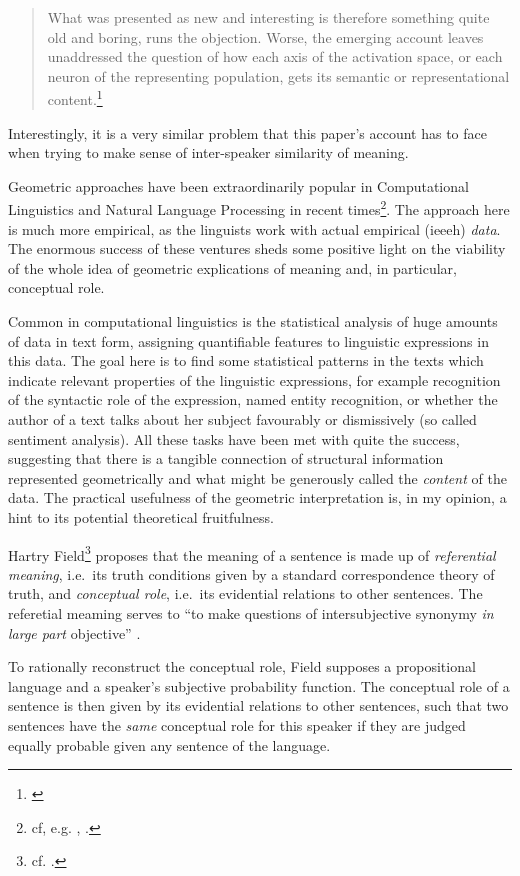 \documentclass[11pt, a4paper]{scrartcl}
\renewcommand{\i}[1]{\emph{#1}}
\begin{document}
{\singlespacing{} 
\begin{quote}What was presented as new and interesting is therefore something quite old and boring, runs the objection. Worse, the emerging account leaves unaddressed the question of how each axis of the activation space, or each neuron of the representing population, gets its semantic or representational content.\footnote{\textcite[7]{10.2307/2564566}}
 \end{quote}
}
 Interestingly, it is a very similar problem that this paper's account has to face when trying to make sense of inter-speaker similarity of meaning.

Geometric approaches have been extraordinarily popular in Computational Linguistics and Natural Language Processing in recent times\footnote{cf, e.g. \textcite{erk2008structured}, \textcite{sahlgren2006word}.}. The approach here is much more empirical, as the linguists work with actual empirical (ieeeh) \i{data}. The enormous success of these ventures sheds some positive light on the viability of the whole idea of geometric explications of meaning and, in particular, conceptual role.

Common in computational linguistics is the statistical analysis of huge amounts of data in text form, assigning quantifiable features to linguistic expressions in this data. The goal here is to find some statistical patterns in the texts which indicate relevant properties of the linguistic expressions, for example recognition of the syntactic role of the expression, named entity recognition, or whether the author of a text talks about her subject favourably or dismissively (so called sentiment analysis). All these tasks have been met with quite the success, suggesting that there is a tangible connection of structural information represented geometrically and what might be generously called the \i{content} of the data. The practical usefulness of the geometric interpretation is, in my opinion, a hint to its potential theoretical fruitfulness. 

Hartry Field\footnote{cf. \textcite{Field1977}.} proposes that the meaning of a sentence is made up of \i{referential meaning}, i.e.\ its truth conditions given by a standard correspondence theory of truth, and \i{conceptual role}, i.e.\ its evidential relations to other sentences. The referetial meaming serves to ``to make questions of intersubjective synonymy \i{in large part} objective'' \parencite[399]{Field1977}.

To rationally reconstruct the conceptual role, Field supposes a propositional language and a speaker's subjective probability function. The conceptual role of a sentence is then given by its evidential relations to other sentences, such that two sentences have the \i{same} conceptual role for this speaker if they are judged equally probable given any sentence of the language. 
\end{document}
